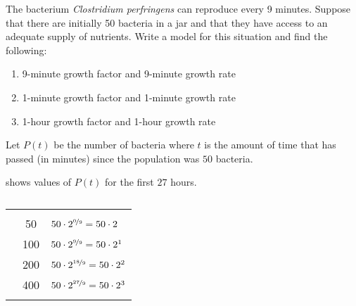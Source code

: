 \begin{pccexample}
	The bacterium {\em Clostridium perfringens} can reproduce every 9 minutes. 
	Suppose that 
	there are initially 50 bacteria in a jar and that they have access to an adequate supply of nutrients.
	Write a model for this situation and find the following:
	\begin{multicols}{3}
		\begin{enumerate}
			\item 9-minute growth factor and 9-minute growth rate
			\item 1-minute growth factor and 1-minute growth rate
			\item 1-hour growth factor and 1-hour growth rate
		\end{enumerate}
	\end{multicols}
	\begin{pccsolution}
		Let $P(t)$ be the number of bacteria where $t$ is the amount of time that 
		has passed (in minutes) since the population was $50$ bacteria. 
														
		 shows values of $P(t)$ for the first $27$ hours.
		\begin{table}[!htb]
			\centering
			\caption{}
			\label{exp:tab:bacterium}
			\begin{tabular}{S[table-format=2.0]S[table-format=3.0]l}
				\beforeheading
				 &  &                  \\
				             & 50               & $50\cdot 2^{\nicefrac{0}{9}}=50\cdot 2$    \\             & 100              & $50\cdot 2^{\nicefrac{9}{9}}=50\cdot 2^1$  \\            & 200              & $50\cdot 2^{\nicefrac{18}{9}}=50\cdot 2^2$ \\            & 400              & $50\cdot 2^{\nicefrac{27}{9}}=50\cdot 2^3$ \\\lastline
			\end{tabular}
		\end{table}
														

\end{pccsolution}
\end{pccexample}
